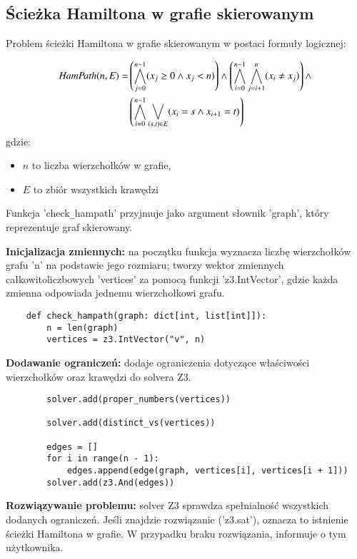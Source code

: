 \subsection{Ścieżka Hamiltona w grafie skierowanym}

Problem ścieżki Hamiltona w grafie skierowanym w postaci formuły logicznej:

\begin{align*}
	{\mathit{HamPath}}(n, E) = & \left( \bigwedge_{j=0}^{n-1} (x_j \geq 0 \land x_j < n) \right) \land 
	\left( \bigwedge_{i=0}^{n-1} \bigwedge_{j=i+1}^{n} (x_i \neq x_j) \right) \land \\ 
	& \left( \bigwedge_{i=0}^{n-1} \bigvee_{(s,t) \in E} (x_i = s \land x_{i+1} = t) \right)
\end{align*}
gdzie:
\begin{itemize}
	\item \(n\) to liczba wierzchołków w grafie,
	\item \(E\) to zbiór wszystkich krawędzi
\end{itemize}
	
Funkcja 'check\verb|_|hampath' przyjmuje jako argument słownik 'graph', który reprezentuje graf skierowany.

\textbf{Inicjalizacja zmiennych: } na początku funkcja wyznacza liczbę wierzchołków grafu 'n' na podstawie jego rozmiaru; tworzy wektor zmiennych całkowitoliczbowych 'vertices' za pomocą funkcji 'z3.IntVector', gdzie każda zmienna odpowiada jednemu wierzchołkowi grafu.

\begin{lstlisting}	
	def check_hampath(graph: dict[int, list[int]]):
		n = len(graph)
		vertices = z3.IntVector("v", n)
\end{lstlisting}
	
\textbf{Dodawanie ograniczeń: } dodaje ograniczenia dotyczące właściwości wierzchołków oraz krawędzi do solvera Z3.

\begin{lstlisting}
		solver.add(proper_numbers(vertices))
	
		solver.add(distinct_vs(vertices))
	
		edges = []
		for i in range(n - 1):
			edges.append(edge(graph, vertices[i], vertices[i + 1]))
		solver.add(z3.And(edges))
\end{lstlisting}

\textbf{Rozwiązywanie problemu: } solver Z3 sprawdza spełnialność wszystkich dodanych ograniczeń. Jeśli znajdzie rozwiązanie ('z3.sat'), oznacza to istnienie ścieżki Hamiltona w grafie. W przypadku braku rozwiązania, informuje o tym użytkownika.

